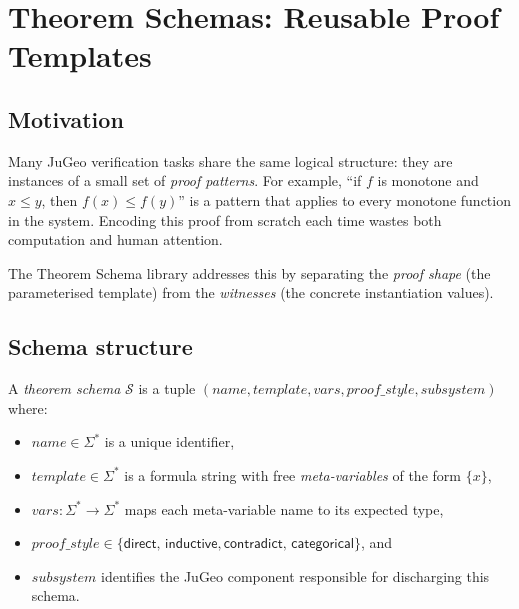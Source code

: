 \documentclass[11pt]{article}
\newcommand{\Schema}{\mathcal{S}}             %
\begin{document}
\section{Theorem Schemas: Reusable Proof Templates}\label{sec:schemas}

\subsection{Motivation}

Many JuGeo verification tasks share the same logical structure: they
are instances of a small set of \emph{proof patterns}.  For example,
``if $f$ is monotone and $x \leq y$, then $f(x) \leq f(y)$'' is a
pattern that applies to every monotone function in the system.
Encoding this proof from scratch each time wastes both computation and
human attention.

The Theorem Schema library addresses this by separating the
\emph{proof shape} (the parameterised template) from the
\emph{witnesses} (the concrete instantiation values).

\subsection{Schema structure}

\begin{definition}\label{def:schema}
A \emph{theorem schema} $\Schema$ is a tuple
$(\mathit{name}, \mathit{template}, \mathit{vars}, \mathit{proof\_style},
  \mathit{subsystem})$ where:
\begin{itemize}
  \item $\mathit{name} \in \Sigma^*$ is a unique identifier,
  \item $\mathit{template} \in \Sigma^*$ is a formula string with
        free \emph{meta-variables} of the form $\{x\}$,
  \item $\mathit{vars} : \Sigma^* \to \Sigma^*$ maps each meta-variable
        name to its expected type,
  \item $\mathit{proof\_style} \in \{\mathsf{direct},\,\mathsf{inductive},
        \mathsf{contradict},\,\mathsf{categorical}\}$, and
  \item $\mathit{subsystem}$ identifies the JuGeo component responsible
        for discharging this schema.
\end{itemize}
\end{definition}
\end{document}
